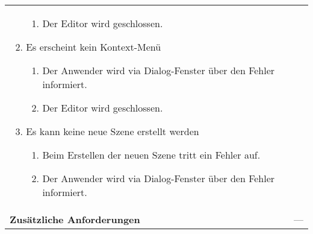 \begin{longtabu}{p{0.5\textwidth}p{0.5\textwidth}}
\begin{enumerate}
{\begin{enumerate}[label= (\roman*)]
                    \item{Der Editor wird geschlossen.}
                \end{enumerate}
            }
            \item{Es erscheint kein Kontext-Menü
                \begin{enumerate}[label= (\roman*)]
                    \item{Der Anwender wird via Dialog-Fenster über den Fehler
                            informiert.}
                    \item{Der Editor wird geschlossen.}
                \end{enumerate}
            }
            \item{Es kann keine neue Szene erstellt werden
                \begin{enumerate}[label= (\roman*)]
                    \item{Beim Erstellen der neuen Szene tritt ein Fehler auf.}
                    \item{Der Anwender wird via Dialog-Fenster über den Fehler
                            informiert.}
                \end{enumerate}
            }
        \end{enumerate} \\
    \cmidrule(r){1-1}\cmidrule(lr){2-2}
        \textbf{Zusätzliche Anforderungen} &
        --- \\
    \bottomrule
\end{longtabu}
